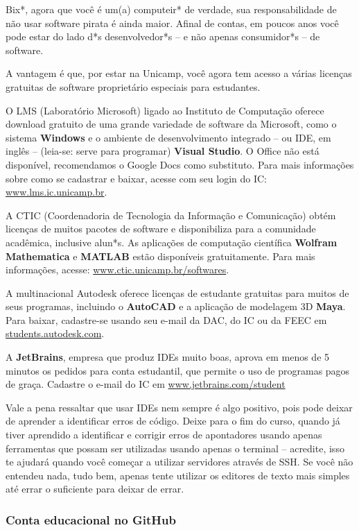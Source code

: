 Bix*, agora que você é um(a) computeir* de verdade, sua responsabilidade de não
usar software pirata é ainda maior. Afinal de contas, em poucos anos você pode
estar do lado d*s desenvolvedor*s -- e não apenas consumidor*s -- de software.

A vantagem é que, por estar na Unicamp, você agora tem acesso a várias licenças
gratuitas de software proprietário especiais para estudantes.

O LMS (Laboratório Microsoft) ligado ao Instituto de Computação oferece
download gratuito de uma grande variedade de software da Microsoft, como o
sistema \textbf{Windows} e o ambiente de desenvolvimento integrado -- ou IDE,
em inglês -- (leia-se: serve para programar) \textbf{Visual Studio}. O Office
não está disponível, recomendamos o Google Docs como substituto. Para mais
informações sobre como se cadastrar e baixar, acesse com seu login do IC:
\url{www.lms.ic.unicamp.br}.

A CTIC (Coordenadoria de Tecnologia da Informação e Comunicação) obtém licenças
de muitos pacotes de software e disponibiliza para a comunidade acadêmica,
inclusive alun*s. As aplicações de computação científica \textbf{Wolfram
Mathematica} e \textbf{MATLAB} estão disponíveis gratuitamente. Para mais
informações, acesse: \url{www.ctic.unicamp.br/softwares}.

A multinacional Autodesk oferece licenças de estudante gratuitas para muitos de
seus programas, incluindo o \textbf{AutoCAD} e a aplicação de modelagem 3D
\textbf{Maya}. Para baixar, cadastre-se usando seu e-mail da DAC, do IC ou da
FEEC em \url{students.autodesk.com}.

A \textbf{JetBrains}, empresa que produz IDEs muito boas, aprova em menos de 5
minutos os pedidos para conta estudantil, que permite o uso de programas pagos
de graça. Cadastre o e-mail do IC em \url{www.jetbrains.com/student}

Vale a pena ressaltar que usar IDEs nem sempre é algo positivo, pois pode
deixar de aprender a identificar erros de código. Deixe para o fim do curso,
quando já tiver aprendido a identificar e corrigir erros de apontadores usando
apenas ferramentas que possam ser utilizadas usando apenas o terminal --
acredite, isso te ajudará quando você começar a utilizar servidores através de
SSH. Se você não entendeu nada, tudo bem, apenas tente utilizar os editores de
texto mais simples até errar o suficiente para deixar de errar.

\subsubsection{Conta educacional no GitHub}

